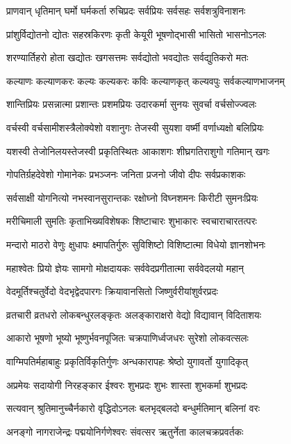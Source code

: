 \twolineshloka
{प्राणवान् धृतिमान् घर्मो घर्मकर्ता रुचिप्रदः}
{सर्वप्रियः सर्वसहः सर्वशत्रुविनाशनः}%

\twolineshloka
{प्रांशुर्विद्योतनो द्योतः सहस्रकिरणः कृती}
{केयूरी भूषणोद्भासी भासितो भासनोऽनलः}%

\twolineshloka
{शरण्यार्तिहरो होता खद्योतः खगसत्तमः}
{सर्वद्योतो भवद्योतः सर्वद्युतिकरो मतः}%

\twolineshloka
{कल्याणः कल्याणकरः कल्यः कल्यकरः कविः}
{कल्याणकृत् कल्यवपुः सर्वकल्याणभाजनम्}%

\twolineshloka
{शान्तिप्रियः प्रसन्नात्मा प्रशान्तः प्रशमप्रियः}
{उदारकर्मा सुनयः सुवर्चा वर्चसोज्ज्वलः}%

\twolineshloka
{वर्चस्वी वर्चसामीशस्त्रैलोक्येशो वशानुगः}
{तेजस्वी सुयशा वर्ष्मी वर्णाध्यक्षो बलिप्रियः}%

\twolineshloka
{यशस्वी तेजोनिलयस्तेजस्वी प्रकृतिस्थितः}
{आकाशगः शीघ्रगतिराशुगो गतिमान् खगः}%

\twolineshloka
{गोपतिर्ग्रहदेवेशो गोमानेकः प्रभञ्जनः}
{जनिता प्रजनो जीवो दीपः सर्वप्रकाशकः}%

\twolineshloka
{सर्वसाक्षी योगनित्यो नभस्वानसुरान्तकः}
{रक्षोघ्नो विघ्नशमनः किरीटी सुमनःप्रियः}%

\twolineshloka
{मरीचिमाली सुमतिः कृताभिख्यविशेषकः}
{शिष्टाचारः शुभाकारः स्वचाराचारतत्परः}%

\twolineshloka
{मन्दारो माठरो वेणुः क्षुधापः क्ष्मापतिर्गुरुः}
{सुविशिष्टो विशिष्टात्मा विधेयो ज्ञानशोभनः}%

\twolineshloka
{महाश्वेतः प्रियो ज्ञेयः सामगो मोक्षदायकः}
{सर्ववेदप्रगीतात्मा सर्ववेदलयो महान्}%

\twolineshloka
{वेदमूर्तिश्चतुर्वेदो वेदभृद्वेदपारगः}
{क्रियावानसितो जिष्णुर्वरीयांशुर्वरप्रदः}%

\twolineshloka
{व्रतचारी व्रतधरो लोकबन्धुरलङ्कृतः}
{अलङ्काराक्षरो वेद्यो विद्यावान् विदिताशयः}%

\twolineshloka
{आकारो भूषणो भूष्यो भूष्णुर्भवनपूजितः}
{चक्रपाणिर्ध्वजधरः सुरेशो लोकवत्सलः}%

\twolineshloka
{वाग्मिपतिर्महाबाहुः प्रकृतिर्विकृतिर्गुणः}
{अन्धकारापहः श्रेष्ठो युगावर्तो युगादिकृत्}%

\twolineshloka
{अप्रमेयः सदायोगी निरहङ्कार ईश्वरः}
{शुभप्रदः शुभः शास्ता शुभकर्मा शुभप्रदः}%

\twolineshloka
{सत्यवान् श्रुतिमानुच्चैर्नकारो वृद्धिदोऽनलः}
{बलभृद्बलदो बन्धुर्मतिमान् बलिनां वरः}%

\twolineshloka
{अनङ्गो नागराजेन्द्रः पद्मयोनिर्गणेश्वरः}
{संवत्सर ऋतुर्नेता कालचक्रप्रवर्तकः}%

